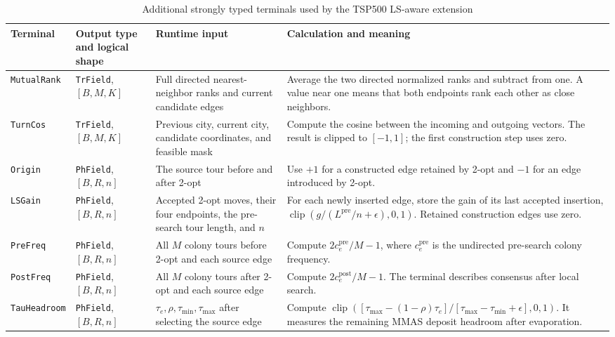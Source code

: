 \documentclass[letterpaper,journal]{IEEEtran}
\begin{document}
\begin{table}[t]
\caption{Additional strongly typed terminals used by the TSP500 LS-aware extension}
\label{tab:ls-terminals}
\centering
\scriptsize
\renewcommand{\arraystretch}{1.16}
\setlength{\tabcolsep}{2.5pt}
\begin{tabular}{L{19mm}L{30mm}L{49mm}L{72mm}}
\toprule
Terminal & Output type and logical shape & Runtime input & Calculation and meaning\\
\midrule
\texttt{MutualRank} &
\texttt{TrField}, \([B,M,K]\) &
Full directed nearest-neighbor ranks and current candidate edges &
Average the two directed normalized ranks and subtract from one.
A value near one means that both endpoints rank each other as close
neighbors.\\
\texttt{TurnCos} &
\texttt{TrField}, \([B,M,K]\) &
Previous city, current city, candidate coordinates, and feasible mask &
Compute the cosine between the incoming and outgoing vectors.
The result is clipped to \([-1,1]\); the first construction step uses zero.\\
\texttt{Origin} &
\texttt{PhField}, \([B,R,n]\) &
The source tour before and after 2-opt &
Use \(+1\) for a constructed edge retained by 2-opt and \(-1\) for an edge
introduced by 2-opt.\\
\texttt{LSGain} &
\texttt{PhField}, \([B,R,n]\) &
Accepted 2-opt moves, their four endpoints, the pre-search tour length, and
\(n\) &
For each newly inserted edge, store the gain of its last accepted insertion,
\(\operatorname{clip}(g/(L^{\mathrm{pre}}/n+\epsilon),0,1)\).
Retained construction edges use zero.\\
\texttt{PreFreq} &
\texttt{PhField}, \([B,R,n]\) &
All \(M\) colony tours before 2-opt and each source edge &
Compute \(2c_e^{\mathrm{pre}}/M-1\), where \(c_e^{\mathrm{pre}}\) is the
undirected pre-search colony frequency.\\
\texttt{PostFreq} &
\texttt{PhField}, \([B,R,n]\) &
All \(M\) colony tours after 2-opt and each source edge &
Compute \(2c_e^{\mathrm{post}}/M-1\).
The terminal describes consensus after local search.\\
\texttt{TauHeadroom} &
\texttt{PhField}, \([B,R,n]\) &
\(\tau_e,\rho,\tau_{\min},\tau_{\max}\) after selecting the source edge &
Compute
\(\operatorname{clip}([\tau_{\max}-(1-\rho)\tau_e]/
[\tau_{\max}-\tau_{\min}+\epsilon],0,1)\).
It measures the remaining MMAS deposit headroom after evaporation.\\
\bottomrule
\end{tabular}
\end{table}
\end{document}
